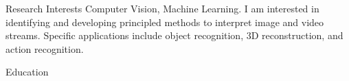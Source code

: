\documentclass{resume}
\begin{document}
\maketitle
\thispagestyle{empty} %

\vspace{-0.5em}

\begin{comment}
\begin{component}{Intended Program of Study}
Electrical Engineering: Systems Ph.D.  \hfill \textbf{U-M ID}: 38829826
\end{component}
\end{comment}

\begin{component}{Research Interests}
Computer Vision, Machine Learning.
I am interested in identifying and developing principled methods to
interpret image and video streams. 
Specific applications include object 
recognition, 3D reconstruction, and action recognition. 
\end{component}

\vspace{0.5em}

\begin{component}{Education}
    
\end{component}

\vspace{0.5em}
\end{document}
